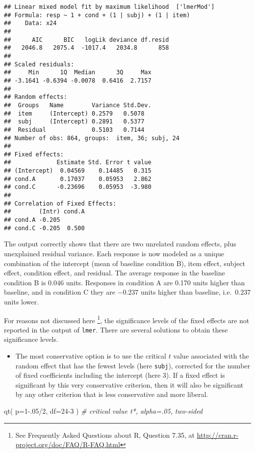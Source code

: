 \documentclass[
]{book}
\newenvironment{Shaded}{\begin{snugshade}}{\end{snugshade}}
\newcommand{\AttributeTok}[1]{\textcolor[rgb]{0.77,0.63,0.00}{#1}}
\newcommand{\CommentTok}[1]{\textcolor[rgb]{0.56,0.35,0.01}{\textit{#1}}}
\newcommand{\DecValTok}[1]{\textcolor[rgb]{0.00,0.00,0.81}{#1}}
\newcommand{\FloatTok}[1]{\textcolor[rgb]{0.00,0.00,0.81}{#1}}
\newcommand{\FunctionTok}[1]{\textcolor[rgb]{0.00,0.00,0.00}{#1}}
\newcommand{\NormalTok}[1]{#1}
\newcommand{\SpecialCharTok}[1]{\textcolor[rgb]{0.00,0.00,0.00}{#1}}
\providecommand{\tightlist}{%
  \setlength{\itemsep}{0pt}\setlength{\parskip}{0pt}}
\begin{document}
\begin{verbatim}
## Linear mixed model fit by maximum likelihood  ['lmerMod']
## Formula: resp ~ 1 + cond + (1 | subj) + (1 | item)
##    Data: x24
## 
##      AIC      BIC   logLik deviance df.resid 
##   2046.8   2075.4  -1017.4   2034.8      858 
## 
## Scaled residuals: 
##     Min      1Q  Median      3Q     Max 
## -3.1641 -0.6394 -0.0078  0.6416  2.7157 
## 
## Random effects:
##  Groups   Name        Variance Std.Dev.
##  item     (Intercept) 0.2579   0.5078  
##  subj     (Intercept) 0.2891   0.5377  
##  Residual             0.5103   0.7144  
## Number of obs: 864, groups:  item, 36; subj, 24
## 
## Fixed effects:
##             Estimate Std. Error t value
## (Intercept)  0.04569    0.14485   0.315
## cond.A       0.17037    0.05953   2.862
## cond.C      -0.23696    0.05953  -3.980
## 
## Correlation of Fixed Effects:
##        (Intr) cond.A
## cond.A -0.205       
## cond.C -0.205  0.500
\end{verbatim}

The output correctly shows that there are two unrelated random effects,
plus unexplained residual variance. Each response is now modeled as a
unique combination of the intercept (mean of baseline condition B), item
effect, subject effect, condition effect, and residual. The average
response in the baseline condition B is \(0.046\) units. Responses in
condition A are 0.170 units higher than baseline, and in condition C
they are \(-0.237\) units higher than baseline, i.e.~\(0.237\) units lower.

For reasons not discussed here \footnote{See Frequently Asked Questions about R, Question
  7.35, at \url{http://cran.r-project.org/doc/FAQ/R-FAQ.html}}, the significance levels of the
fixed effects are not reported in the output of
\texttt{lmer}. There are several solutions to obtain
these significance levels.

\begin{itemize}
\tightlist
\item
  The most conservative option \citep{HMS18} is to use the critical \(t\) value
  associated with the random effect that has the fewest levels (here
  \texttt{subj}), corrected for the number of fixed
  coefficients including the intercept (here \(3\)).
  If a fixed effect is significant by this very
  conservative criterion, then it will also be significant by any other
  criterion that is less conservative and more liberal.
\end{itemize}

\begin{Shaded}
\begin{Highlighting}[]
\FunctionTok{qt}\NormalTok{( }\AttributeTok{p=}\DecValTok{1}\FloatTok{{-}.05}\SpecialCharTok{/}\DecValTok{2}\NormalTok{, }\AttributeTok{df=}\DecValTok{24{-}3}\NormalTok{ ) }\CommentTok{\# critical value t*, alpha=.05, two{-}sided}
\end{Highlighting}
\end{Shaded}
\end{document}
